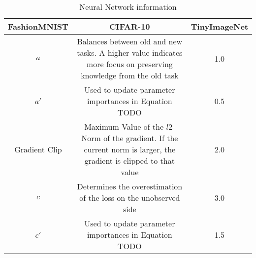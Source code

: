 \begin{table}
    \centering
    \begin{tabularx}{\textwidth}{c | c c } 
        \hline
         FashionMNIST & CIFAR-10 & TinyImageNet \\ 
        \hline 
        $a$ & Balances between old and new tasks. A higher value indicates more focus
        on preserving knowledge from the old task & 1.0  \\ 
        $a'$ & Used to update parameter importances in Equation TODO & 0.5  \\
        Gradient Clip & Maximum Value of the $l2$-Norm of the gradient. If the current norm is larger, the
        gradient is clipped to that value & 2.0 \\ 
        $c$ & Determines the overestimation of the loss on the unobserved side & 3.0 \\
        $c'$ & Used to update parameter importances in Equation TODO & 1.5 \\
        \hline
    \end{tabularx}
    \caption{Neural Network information}
    \label{fig:NNArchitectures}
\end{table}